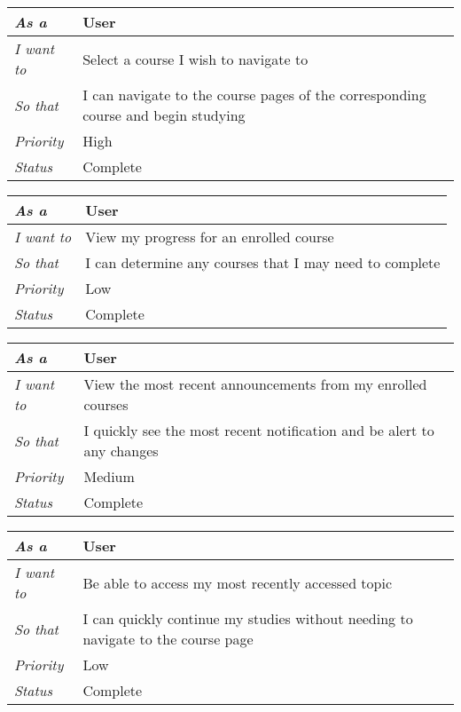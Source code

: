 \begin{table}[h!]
    \begin{tabular}{|l|l|}
        \hline
        \textit{As a} & User \\ \hline
        \textit{I want to} & Select a course I wish to navigate to \\ \hline
        \textit{So that} & I can navigate to the course pages of the corresponding course and begin studying \\ \hline
        \textit{Priority} & {\color[HTML]{FE0000} High} \\ \hline
        \textit{Status} & Complete \\ \hline
    \end{tabular}
\end{table}

\begin{table}[h!]
    \begin{tabular}{|l|l|}
        \hline
        \textit{As a} & User \\ \hline
        \textit{I want to} & View my progress for an enrolled course \\ \hline
        \textit{So that} & I can determine any courses that I may need to complete\\ \hline
        \textit{Priority} & {\color[HTML]{3166FF} Low} \\ \hline
        \textit{Status} & Complete \\ \hline
    \end{tabular}
\end{table}

\begin{table}[h!]
    \begin{tabular}{|l|l|}
        \hline
        \textit{As a} & User \\ \hline
        \textit{I want to} & View the most recent announcements from my enrolled courses \\ \hline
        \textit{So that} & I quickly see the most recent notification and be alert to any changes \\ \hline
        \textit{Priority} & {\color[HTML]{FE996B} Medium} \\ \hline
        \textit{Status} & Complete \\ \hline
    \end{tabular}
\end{table}

\begin{table}[h!]
    \begin{tabular}{|l|l|}
        \hline
        \textit{As a} & User \\ \hline
        \textit{I want to} & Be able to access my most recently accessed topic \\ \hline
        \textit{So that} & I can quickly continue my studies without needing to navigate to the course page \\ \hline
        \textit{Priority} & {\color[HTML]{3166FF} Low} \\ \hline
        \textit{Status} & Complete \\ \hline
    \end{tabular}
\end{table}

